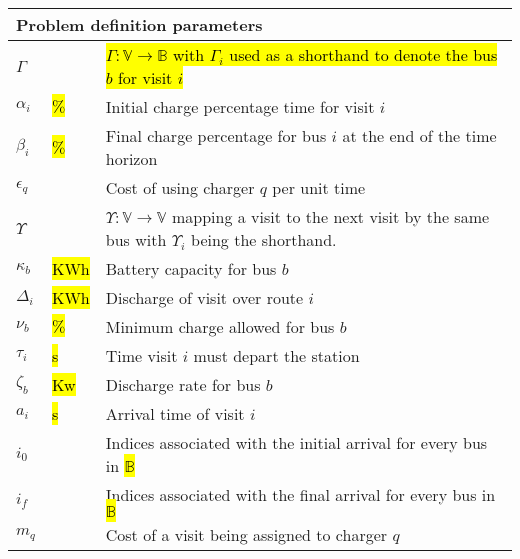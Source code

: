 \documentclass[utf8]{FrontiersinHarvard}
\begin{document}
\begin{table}[!htpb]
\begin{tabularx}{\textwidth}{l l l}
    \multicolumn{3}{l}{Problem definition parameters}                                                                               \\
    \hline
    $\Gamma$          & & \hl{$\Gamma: \mathbb{V} \rightarrow \mathbb{B}$ with $\Gamma_i$ used as a shorthand to denote the bus $b$ for visit $i$}           \\
    $\alpha_i$        & \hl{$\%$} & Initial charge percentage time for visit $i$                                                              \\
    $\beta_i$        & \hl{$\%$} & Final charge percentage for bus $i$ at the end of the time horizon                                        \\
    $\epsilon_q$        & & Cost of using charger $q$ per unit time                                                                        \\
    $\Upsilon$          & & $\Upsilon: \mathbb{V} \rightarrow \mathbb{V}$ mapping a visit to the next visit by the same bus with $\Upsilon_i$ being the shorthand. \\
    $\kappa_b$        & \hl{KWh} & Battery capacity for bus $b$                                                                          \\
    $\Delta_i$        & \hl{KWh} & Discharge of visit over route $i$                                                                     \\
    $\nu_b$        & \hl{$\%$} & Minimum charge allowed for bus $b$                                                                             \\
    $\tau_i$        & \hl{s} & Time visit $i$ must depart the station                                                                  \\
    $\zeta_b$        & \hl{Kw} & Discharge rate for bus $b$                                                                             \\
    $a_i$        & \hl{s} & Arrival time of visit  $i$                                                                              \\
    $i_0$        & & Indices associated with the initial arrival for every bus in \hl{$\mathbb{B}$}                                 \\
    $i_f$        & & Indices associated with the final arrival for every bus in \hl{$\mathbb{B}$}                                   \\
    $m_q$        & & Cost of a visit being assigned to charger $q$                                                                  \\

\end{tabularx}
\end{table}
\end{document}
